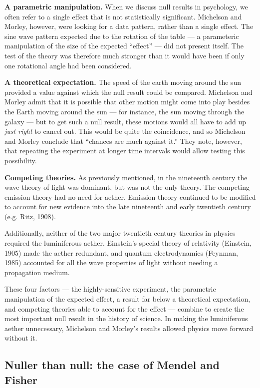 \documentclass[english,floatsintext,man]{apa6}
\theoremstyle{definition}
\theoremstyle{definition}
\theoremstyle{definition}
\theoremstyle{remark}
\begin{document}
\textbf{A parametric manipulation.} When we discuss null results in
psychology, we often refer to a single effect that is not statistically
significant. Michelson and Morley, however, were looking for a data
pattern, rather than a single effect. The sine wave pattern expected due
to the rotation of the table --- a parameteric manipulation of the size
of the expected \enquote{effect} --- did not present itself. The test of
the theory was therefore much stronger than it would have been if only
one rotational angle had been considered.

\textbf{A theoretical expectation.} The speed of the earth moving around
the sun provided a value against which the null result could be
compared. Michelson and Morley admit that it is possible that other
motion might come into play besides the Earth moving around the sun ---
for instance, the sun moving through the galaxy --- but to get such a
null result, these motions would all have to add up \emph{just right} to
cancel out. This would be quite the coincidence, and so Michelson and
Morley conclude that \enquote{chances are much against it.} They note,
however, that repeating the experiment at longer time intervals would
allow testing this possibility.

\textbf{Competing theories.} As previously mentioned, in the nineteenth
century the wave theory of light was dominant, but was not the only
theory. The competing emission theory had no need for aether. Emission
theory continued to be modified to account for new evidence into the
late nineteenth and early twentieth century (e.g. Ritz, 1908).

Additionally, neither of the two major twentieth century theories in
physics required the luminiferous aether. Einstein's special theory of
relativity (Einstein, 1905) made the aether redundant, and quantum
electrodynamics (Feynman, 1985) accounted for all the wave properties of
light without needing a propagation medium.

These four factors --- the highly-sensitive experiment, the parametric
manipulation of the expected effect, a result far below a theoretical
expectation, and competing theories able to account for the effect ---
combine to create the most important null result in the history of
science. In making the luminiferous aether unnecessary, Michelson and
Morley's results allowed physics move forward without it.

\subsection{Nuller than null: the case of Mendel and
Fisher}\label{nuller-than-null-the-case-of-mendel-and-fisher}
\end{document}
